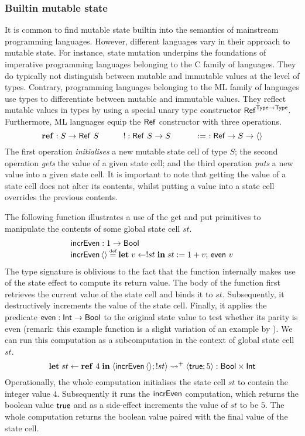 \documentclass[12pt,phd,lfcs,twoside,openright,logo,leftchapter,normalheadings]{infthesis}
\theoremstyle{plain}
\theoremstyle{definition}
\begin{document}
%
\subsubsection{Builtin mutable state}
It is common to find mutable state builtin into the semantics of
mainstream programming languages. However, different languages vary in
their approach to mutable state. For instance, state mutation
underpins the foundations of imperative programming languages
belonging to the C family of languages. They do typically not
distinguish between mutable and immutable values at the level of
types. Contrary, programming languages belonging to the ML family of
languages use types to differentiate between mutable and immutable
values. They reflect mutable values in types by using a special unary
type constructor $\mathsf{Ref}^{\mathsf{Type} \to \mathsf{Type}}$. Furthermore, ML
languages equip the $\mathsf{Ref}$ constructor with three operations.
%
\[
  \mathbf{ref} : S \to \mathsf{Ref}~S \qquad\quad
  ! : \mathsf{Ref}~S \to S     \qquad\quad
  \mathrel{:=}~ : \mathsf{Ref} \to S \to \langle  \rangle
\]
%
The first operation \emph{initialises} a new mutable state cell of
type $S$; the second operation \emph{gets} the value of a given state
cell; and the third operation \emph{puts} a new value into a given
state cell. It is important to note that getting the value of a state
cell does not alter its contents, whilst putting a value into a state
cell overrides the previous contents.

The following function illustrates a use of the get and put primitives
to manipulate the contents of some global state cell $st$.
%
\[
  \bl
    \incrEven : \UnitType \to \Bool\\
    \incrEven\,\Unit \defas \Let\;v \revto !st\;\In\;st \defnas 1 + v;\,\even~v
  \el
\]
%
The type signature is oblivious to the fact that the function
internally makes use of the state effect to compute its return value.
%
The body of the function first retrieves the current value of the
state cell and binds it to $st$. Subsequently, it destructively
increments the value of the state cell. Finally, it applies the
predicate $\mathsf{even} : \mathsf{Int} \to \mathsf{Bool}$ to the original state value to test
whether its parity is even (remark: this example function is a slight
variation of an example by \citet{Gibbons12}).
%
We can run this computation as a subcomputation in the context of
global state cell $st$.
%
\[
  \mathbf{let}\;st \leftarrow \mathbf{ref}~4\;\mathbf{in}\;\langle \mathsf{incrEven}\,\langle  \rangle;!st \rangle \leadsto^+ \langle \mathsf{true};5 \rangle : \mathsf{Bool} \times \mathsf{Int}
\]
%
Operationally, the whole computation initialises the state cell $st$
to contain the integer value $4$. Subsequently it runs the $\mathsf{incrEven}$
computation, which returns the boolean value $\mathsf{true}$ and as a
side-effect increments the value of $st$ to be $5$. The whole
computation returns the boolean value paired with the final value of
the state cell.
\end{document}
